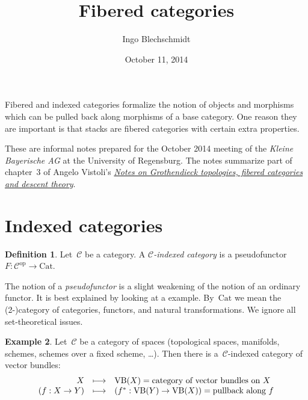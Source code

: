 \documentclass[a4paper,english,12pt]{scrartcl}
\theoremstyle{definition}
\newtheorem{defn}{Definition}[section]
\newtheorem{ex}[defn]{Example}
\theoremstyle{plain}
\theoremstyle{remark}
\newcommand{\C}{\mathcal{C}}
\newcommand{\op}{\mathrm{op}}
\newcommand{\Cat}{\mathrm{Cat}}
\newcommand{\VB}{\mathrm{VB}}
\begin{document}
\title{Fibered categories}
\author{Ingo Blechschmidt}
\date{October 11, 2014}
\maketitle

\begin{center}\begin{minipage}{0.8\textwidth}
Fibered and indexed categories formalize the notion of objects and morphisms
which can be pulled back along morphisms of a base category. One reason they
are important is that stacks are fibered categories with certain extra
properties.\medskip

These are informal notes prepared for the October 2014 meeting of the \emph{Kleine
Bayerische AG} at the University of Regensburg. The notes summarize part of
chapter~3 of Angelo Vistoli's
\href{http://homepage.sns.it/vistoli/descent.pdf}{\emph{Notes on Grothendieck
topologies, fibered categories and descent theory}}.
\end{minipage}\end{center}
\vspace{1em}

\tableofcontents

\section{Indexed categories}

\begin{defn}Let~$\C$ be a category. A \emph{$\C$-indexed category} is a
pseudofunctor~$F : \C^\op \to \Cat$.\end{defn}

The notion of a \emph{pseudofunctor} is a slight weakening of the notion of an
ordinary functor. It is best explained by looking at a example. By~$\Cat$ we
mean the (2-)category of categories, functors, and natural transformations. We
ignore all set-theoretical issues.

\begin{ex}\label{ex:vb}Let~$\C$ be a category of spaces (topological spaces,
manifolds, schemes, schemes over a fixed scheme, \ldots). Then there is
a~$\C$-indexed category of vector bundles:
\[ \begin{array}{@{}rcl@{}}
  X &\longmapsto& \VB(X) = \text{category of vector bundles on~$X$} \\
  (f : X \to Y) &\longmapsto&
    (f^* : \VB(Y) \to \VB(X)) = \text{pullback along~$f$}
\end{array} \]
\end{ex}
\end{document}
